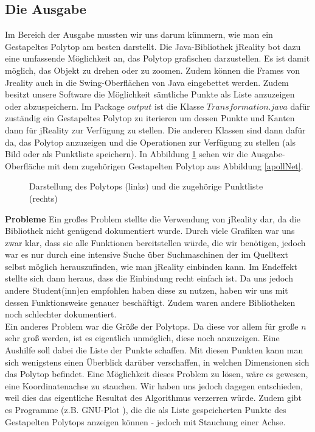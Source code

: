\subsection*{Die Ausgabe}
Im Bereich der Ausgabe mussten wir uns darum kümmern, wie man ein Gestapeltes Polytop am besten darstellt. Die Java-Bibliothek jReality bot dazu eine umfassende Möglichkeit an, das Polytop grafischen darzustellen. Es ist damit möglich, das Objekt zu drehen oder zu zoomen. Zudem können die Frames von Jreality auch in die Swing-Oberflächen von Java eingebettet werden. Zudem besitzt unsere Software die Möglichkeit sämtliche Punkte als Liste anzuzeigen oder abzuspeichern. Im Package $output$ ist die Klasse $Transformation.java$ dafür zuständig ein Gestapeltes Polytop zu iterieren um dessen Punkte und Kanten dann für jReality zur Verfügung zu stellen. Die anderen Klassen sind dann dafür da, das Polytop anzuzeigen und die Operationen zur Verfügung zu stellen (als Bild oder als Punktliste speichern). In Abbildung \ref{polytop} sehen wir die Ausgabe-Oberfläche mit dem zugehörigen Gestapelten Polytop aus Abbildung \ref{apollNet}.\\

\begin{figure}[htbp]
	\centering
	\caption{Darstellung des Polytops (links) und die zugehörige Punktliste (rechts)}
	\label{polytop}
\end{figure}

\textbf{Probleme} Ein großes Problem stellte die Verwendung von jReality dar, da die Bibliothek nicht genügend dokumentiert wurde. Durch viele Grafiken war uns zwar klar, dass sie alle Funktionen bereitstellen würde, die wir benötigen, jedoch war es nur durch eine intensive Suche über Suchmaschinen der im Quelltext selbst möglich herauszufinden, wie man jReality einbinden kann. Im Endeffekt stellte sich dann heraus, dass die Einbindung recht einfach ist. Da uns jedoch andere Student(inn)en empfohlen haben diese zu nutzen, haben wir uns mit dessen Funktionsweise genauer beschäftigt. Zudem waren andere Bibliotheken noch schlechter dokumentiert.\\
Ein anderes Problem war die Größe der Polytops. Da diese vor allem für große $n$ sehr groß werden, ist es eigentlich unmöglich, diese noch anzuzeigen. Eine Aushilfe soll dabei die Liste der Punkte schaffen. Mit diesen Punkten kann man sich wenigstens einen Überblick darüber verschaffen, in welchen Dimensionen sich das Polytop befindet. Eine Möglichkeit dieses Problem zu lösen, wäre es gewesen, eine Koordinatenachse zu stauchen. Wir haben uns jedoch dagegen entschieden, weil dies das eigentliche Resultat des Algorithmus verzerren würde. Zudem gibt es Programme (z.B. GNU-Plot \cite{gnuplot}), die die als Liste gespeicherten Punkte des Gestapelten Polytops anzeigen können - jedoch mit Stauchung einer Achse.

